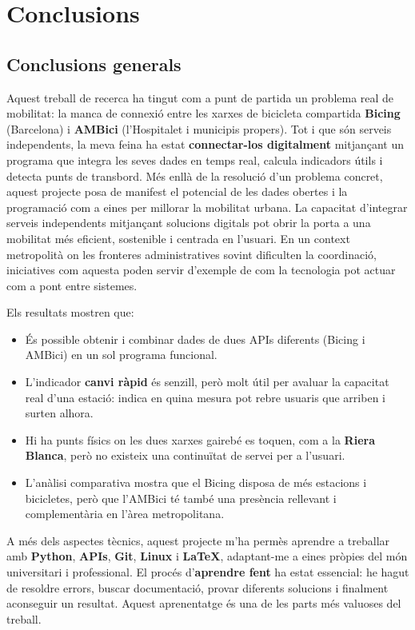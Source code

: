 \chapter{Conclusions}
\label{c:conclusions}

\section{Conclusions generals}
Aquest treball de recerca ha tingut com a punt de partida un problema real de mobilitat: la manca de connexió entre les xarxes de bicicleta compartida \textbf{Bicing} (Barcelona) i \textbf{AMBici} (l’Hospitalet i municipis propers).
Tot i que són serveis independents, la meva feina ha estat \textbf{connectar-los digitalment} mitjançant un programa que integra les seves dades en temps real, calcula indicadors útils i detecta punts de transbord. Més enllà de la resolució d’un problema concret, aquest projecte posa de manifest el potencial de les dades obertes i la programació com a eines per millorar la mobilitat urbana. La capacitat d’integrar serveis independents mitjançant solucions digitals pot obrir la porta a una mobilitat més eficient, sostenible i centrada en l’usuari. En un context metropolità on les fronteres administratives sovint dificulten la coordinació, iniciatives com aquesta poden servir d’exemple de com la tecnologia pot actuar com a pont entre sistemes.

Els resultats mostren que:
\begin{itemize}
    \item És possible obtenir i combinar dades de dues APIs diferents (Bicing i AMBici) en un sol programa funcional.
    \item L’indicador \textbf{canvi ràpid} és senzill, però molt útil per avaluar la capacitat real d’una estació: indica en quina mesura pot rebre usuaris que arriben i surten alhora.
    \item Hi ha punts físics on les dues xarxes gairebé es toquen, com a la \textbf{Riera Blanca}, però no existeix una continuïtat de servei per a l’usuari.
    \item L’anàlisi comparativa mostra que el Bicing disposa de més estacions i bicicletes, però que l’AMBici té també una presència rellevant i complementària en l’àrea metropolitana.
\end{itemize}

A més dels aspectes tècnics, aquest projecte m’ha permès aprendre a treballar amb \textbf{Python}, \textbf{APIs}, \textbf{Git}, \textbf{Linux} i \textbf{LaTeX}, adaptant-me a eines pròpies del món universitari i professional.
El procés d’\textbf{aprendre fent} ha estat essencial: he hagut de resoldre errors, buscar documentació, provar diferents solucions i finalment aconseguir un resultat.
Aquest aprenentatge és una de les parts més valuoses del treball.

